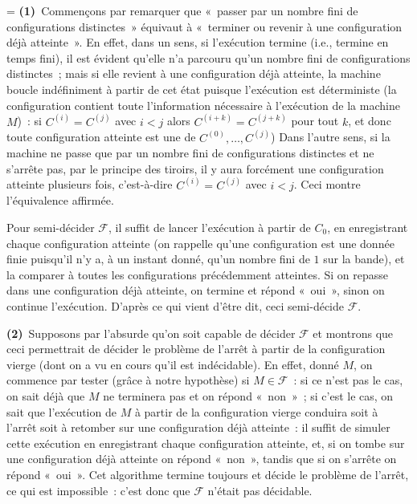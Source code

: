 \documentclass[12pt,a4paper]{article}
\theoremstyle{definition}
\newif\ifcorrige
\newenvironment{corrige}%
{\ifcorrige\relax\else\setbox0=\vbox\bgroup\fi%
\smallbreak\footnotesize\noindent{\underbar{\textit{Corrigé.}}\quad}}
{{\hbox{}\nobreak\hfill\checkmark}%
\ifcorrige\relax\else\egroup\fi\par}
\begin{document}
\begin{corrige}
\textbf{(1)} Commençons par remarquer que « passer par un nombre fini
de configurations distinctes » équivaut à « terminer ou revenir à une
configuration déjà atteinte ».  En effet, dans un sens, si l'exécution
termine (i.e., termine en temps fini), il est évident qu'elle n'a
parcouru qu'un nombre fini de configurations distinctes ; mais si elle
revient à une configuration déjà atteinte, la machine boucle
indéfiniment à partir de cet état puisque l'exécution est déterministe
(la configuration contient toute l'information nécessaire à
l'exécution de la machine $M$) : si $C^{(i)} = C^{(j)}$ avec $i<j$
alors $C^{(i+k)} = C^{(j+k)}$ pour tout $k$, et donc toute
configuration atteinte est une de $C^{(0)}, \ldots, C^{(j)}$) Dans
l'autre sens, si la machine ne passe que par un nombre fini de
configurations distinctes et ne s'arrête pas, par le principe des
tiroirs, il y aura forcément une configuration atteinte plusieurs
fois, c'est-à-dire $C^{(i)} = C^{(j)}$ avec $i<j$.  Ceci montre
l'équivalence affirmée.

Pour semi-décider $\mathscr{F}$, il suffit de lancer l'exécution à
partir de $C_0$, en enregistrant chaque configuration atteinte (on
rappelle qu'une configuration est une donnée finie puisqu'il n'y a, à
un instant donné, qu'un nombre fini de $1$ sur la bande), et la
comparer à toutes les configurations précédemment atteintes.  Si on
repasse dans une configuration déjà atteinte, on termine et répond
« oui », sinon on continue l'exécution.  D'après ce qui vient d'être
dit, ceci semi-décide $\mathscr{F}$.

\textbf{(2)} Supposons par l'absurde qu'on soit capable de décider
$\mathscr{F}$ et montrons que ceci permettrait de décider le problème
de l'arrêt à partir de la configuration vierge (dont on a vu en cours
qu'il est indécidable).  En effet, donné $M$, on commence par tester
(grâce à notre hypothèse) si $M \in \mathscr{F}$ : si ce n'est pas le
cas, on sait déjà que $M$ ne terminera pas et on répond « non » ; si
c'est le cas, on sait que l'exécution de $M$ à partir de la
configuration vierge conduira soit à l'arrêt soit à retomber sur une
configuration déjà atteinte : il suffit de simuler cette exécution en
enregistrant chaque configuration atteinte, et, si on tombe sur une
configuration déjà atteinte on répond « non », tandis que si on
s'arrête on répond « oui ».  Cet algorithme termine toujours et décide
le problème de l'arrêt, ce qui est impossible : c'est donc que
$\mathscr{F}$ n'était pas décidable.
\end{corrige}
\end{document}
